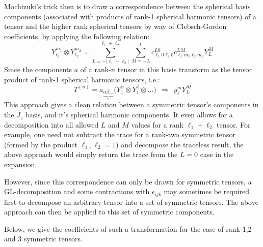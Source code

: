 \documentclass[10pt,a4paper]{article}
\begin{document}
Mochizuki's trick then is to draw a correspondence between the spherical basis components (associated with products of rank-1 spherical harmonic tensors) of a tensor and the higher rank spherical tensors by way of Clebsch-Gordon coefficients, by applying the following relation:
$$
Y_{\ell_1}^{m_1}\otimes Y_{\ell_2}^{m_2} = \sum_{L=-|\ell_1-\ell_2|}^{\ell_1+\ell_2}\sum_{M=-L}^{L}c_{\ell_1 0 \ell_2 0}^{L0}c_{\ell_1 m_1 \ell_2 m_2}^{LM}Y_{L}^M
$$
Since the components $a$ of a rank-$n$ tensor in this basis transform as the tensor product of rank-1 spherical harmonic tensors, i.e.:
$$ 
T^{(n)} = a_{\underbrace{\alpha\beta...}_n}\big(Y_1^\alpha \otimes Y_1^\beta\otimes ... \big)\ \  \Rightarrow\ \  y_\ell^m Y_L^M
$$
This approach gives a clean relation between a symmetric tensor's components in the $J_z$ basis, and it's spherical harmonic components. It even allows for a decomposition into all allowed $L$ and $M$ values for a rank $\ell_1+\ell_2$ tensor. For example, one need not subtract the trace for a rank-two symmetric tensor (formed by the product $\ell_1,\ell_2=1$) and decompose the traceless result, the above approach would simply return the trace from the $L=0$ case in the expansion.

However, since this correspondence can only be drawn for symmetric tensors, a GL-decomposition and some contractions with $\epsilon_{ijk}$ may sometimes be required first to decompose an arbitrary tensor into a set of symmetric tensors. The above approach can then be applied to this set of symmetric components.

Below, we give the coefficients of such a transformation for the case of rank-1,2 and 3 symmetric tensors.
\end{document}
